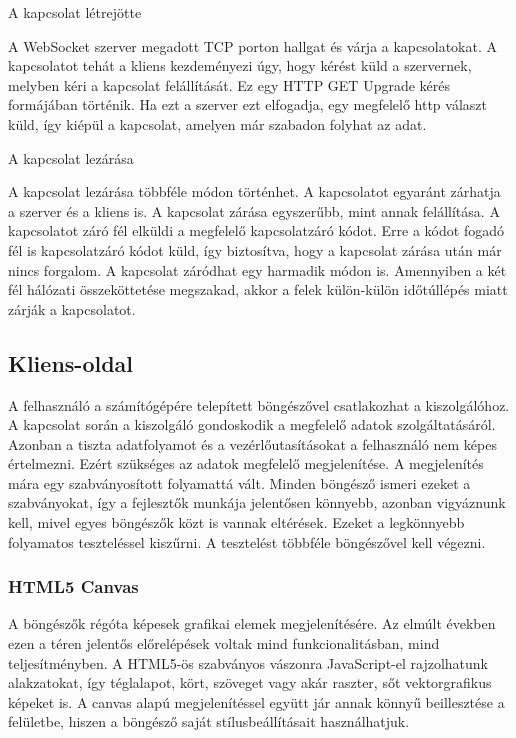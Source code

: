 \documentclass[]{article}
\begin{document}
A kapcsolat létrejötte

A WebSocket szerver megadott TCP porton hallgat és várja a
kapcsolatokat. A kapcsolatot tehát a kliens kezdeményezi úgy, hogy
kérést küld a szervernek, melyben kéri a kapcsolat felállítását. Ez egy
HTTP GET Upgrade kérés formájában történik. Ha ezt a szerver ezt
elfogadja, egy megfelelő http választ küld, így kiépül a kapcsolat,
amelyen már szabadon folyhat az adat.

A kapcsolat lezárása

A kapcsolat lezárása többféle módon történhet. A kapcsolatot egyaránt
zárhatja a szerver és a kliens is. A kapcsolat zárása egyszerűbb, mint
annak felállítása. A kapcsolatot záró fél elküldi a megfelelő
kapcsolatzáró kódot. Erre a kódot fogadó fél is kapcsolatzáró kódot
küld, így biztosítva, hogy a kapcsolat zárása után már nincs forgalom. A
kapcsolat záródhat egy harmadik módon is. Amennyiben a két fél hálózati
összeköttetése megszakad, akkor a felek külön-külön időtúllépés miatt
zárják a kapcsolatot.


\subsection{Kliens-oldal}

A felhasználó a számítógépére telepített böngészővel csatlakozhat a
kiszolgálóhoz. A kapcsolat során a kiszolgáló gondoskodik a megfelelő
adatok szolgáltatásáról. Azonban a tiszta adatfolyamot és a
vezérlőutasításokat a felhasználó nem képes értelmezni. Ezért szükséges
az adatok megfelelő megjelenítése. A megjelenítés mára egy
szabványosított folyamattá vált. Minden böngésző ismeri ezeket a
szabványokat, így a fejlesztők munkája jelentősen könnyebb, azonban
vigyáznunk kell, mivel egyes böngészők közt is vannak eltérések. Ezeket
a legkönnyebb folyamatos teszteléssel kiszűrni. A tesztelést többféle
böngészővel kell végezni.


\subsubsection{HTML5 Canvas}

A böngészők régóta képesek grafikai elemek megjelenítésére. Az elmúlt
években ezen a téren jelentős előrelépések voltak mind
funkcionalitásban, mind teljesítményben. A HTML5-ös szabványos vászonra
JavaScript-el rajzolhatunk alakzatokat, így téglalapot, kört, szöveget
vagy akár raszter, sőt vektorgrafikus képeket is. A canvas alapú
megjelenítéssel együtt jár annak könnyű beillesztése a felületbe, hiszen
a böngésző saját stílusbeállításait használhatjuk.
\end{document}
